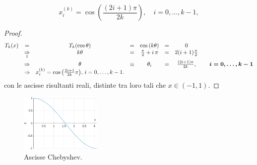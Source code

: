 \begin{property}
\begin{itemize}
\begin{equation}
			x^{(k)}_i = \cos{\left(\frac{(2i+1)\pi}{2k}\right)},\quad i=0,\hdots,k-1,
		\end{equation}
		\begin{proof}
				\begin{equation*}
				\begin{matrix}
					T_k(x)&=&T_k(\cos\theta) &=& \cos{(k\theta)} &=& 0\\
					&\underset{\footnotemark}{\Rightarrow}& k\theta &=& \frac{\pi}{2}+i\,\pi &=& 2(i+1)\frac{\pi}{2} \\
					&\Rightarrow&\theta &\equiv& \theta_i &=& \frac{(2i+1)\pi}{2k},&& \boldsymbol{i=0,\hdots,k-1}\\
					&\Rightarrow& x_i^{(k)} = \cos{\left(\frac{2i+1}{2k}\pi\right)},\, i=0,\hdots,k-1.
				\end{matrix}
			\end{equation*}
			con le ascisse risultanti reali, distinte tra loro tali che $x\in(-1,1)$.
		\end{proof} 
	\end{itemize}
\end{property}

\begin{figure}
    \centering
    \includegraphics[width=0.35\textwidth]{immagini/ascisse_chebyshev.pdf}
    \caption{Ascisse Chebyshev.}\label{fig:ascisse_chebyshev}
\end{figure}

